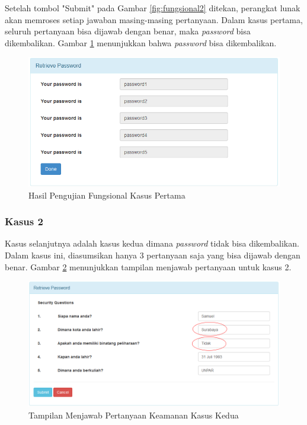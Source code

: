 Setelah tombol "Submit" pada Gambar \ref{fig:fungsional2} ditekan, perangkat lunak akan memroses setiap jawaban masing-masing pertanyaan. Dalam kasus pertama, seluruh pertanyaan bisa dijawab dengan benar, maka \textit{password} bisa dikembalikan. Gambar \ref{fig:fungsional3} menunjukkan bahwa \textit{password} bisa dikembalikan.

\begin{figure}[H]
	\includegraphics[scale=0.7]{Gambar/fungsional3}
	\centering
	\caption{Hasil Pengujian Fungsional Kasus Pertama}\label{fig:fungsional3}
\end{figure}

\subsubsection{Kasus 2}

Kasus selanjutnya adalah kasus kedua dimana \textit{password} tidak bisa dikembalikan. Dalam kasus ini, diasumsikan hanya 3 pertanyaan saja yang bisa dijawab dengan benar. Gambar \ref{fig:fungsional4} menunjukkan tampilan menjawab pertanyaan untuk kasus 2.

\begin{figure}[H]
	\includegraphics[scale=0.6]{Gambar/fungsional4}
	\centering
	\caption{Tampilan Menjawab Pertanyaan Keamanan Kasus Kedua}\label{fig:fungsional4}
\end{figure}

